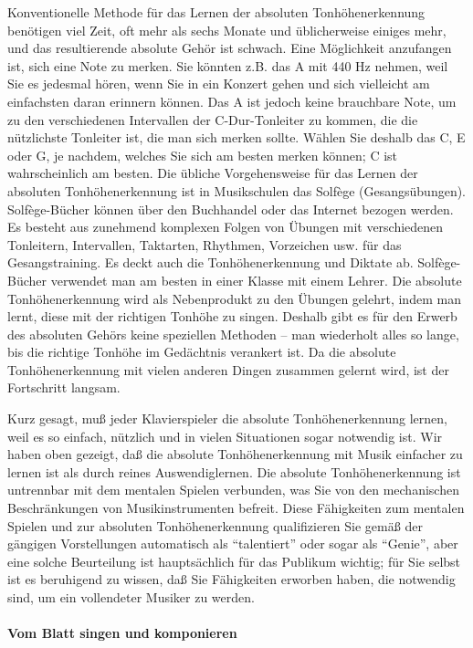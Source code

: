Konventionelle Methode für das Lernen der absoluten Tonhöhenerkennung benötigen viel Zeit, oft mehr als sechs Monate und üblicherweise einiges mehr, und das resultierende absolute Gehör ist schwach.
Eine Möglichkeit anzufangen ist, sich eine Note zu merken.
Sie könnten z.B. das A mit 440 Hz nehmen, weil Sie es jedesmal hören, wenn Sie in ein Konzert gehen und sich vielleicht am einfachsten daran erinnern können.
Das A ist jedoch keine brauchbare Note, um zu den verschiedenen Intervallen der C-Dur-Tonleiter zu kommen, die die nützlichste Tonleiter ist, die man sich merken sollte.
Wählen Sie deshalb das C, E oder G, je nachdem, welches Sie sich am besten merken können; C ist wahrscheinlich am besten.
Die übliche Vorgehensweise für das Lernen der absoluten Tonhöhenerkennung ist in Musikschulen das Solfège (Gesangsübungen).
Solfège-Bücher können über den Buchhandel oder das Internet bezogen werden.
Es besteht aus zunehmend komplexen Folgen von Übungen mit verschiedenen Tonleitern, Intervallen, Taktarten, Rhythmen, Vorzeichen usw. für das Gesangstraining.
Es deckt auch die Tonhöhenerkennung und Diktate ab.
Solfège-Bücher verwendet man am besten in einer Klasse mit einem Lehrer.
Die absolute Tonhöhenerkennung wird als Nebenprodukt zu den Übungen gelehrt, indem man lernt, diese mit der richtigen Tonhöhe zu singen.
Deshalb gibt es für den Erwerb des absoluten Gehörs keine speziellen Methoden -- man wiederholt alles so lange, bis die richtige Tonhöhe im Gedächtnis verankert ist.
Da die absolute Tonhöhenerkennung mit vielen anderen Dingen zusammen gelernt wird, ist der Fortschritt langsam.

Kurz gesagt, muß jeder Klavierspieler die absolute Tonhöhenerkennung lernen, weil es so einfach, nützlich und in vielen Situationen sogar notwendig ist.
Wir haben oben gezeigt, daß die absolute Tonhöhenerkennung mit Musik einfacher zu lernen ist als durch reines Auswendiglernen.
Die absolute Tonhöhenerkennung ist untrennbar mit dem mentalen Spielen verbunden, was Sie von den mechanischen Beschränkungen von Musikinstrumenten befreit.
Diese Fähigkeiten zum mentalen Spielen und zur absoluten Tonhöhenerkennung qualifizieren Sie gemäß der gängigen Vorstellungen automatisch als \enquote{talentiert} oder sogar als \enquote{Genie}, aber eine solche Beurteilung ist hauptsächlich für das Publikum wichtig; für Sie selbst ist es beruhigend zu wissen, daß Sie Fähigkeiten erworben haben, die notwendig sind, um ein vollendeter Musiker zu werden.


\paragraph{Vom Blatt singen und komponieren}
\label{c1iii12blatt}

